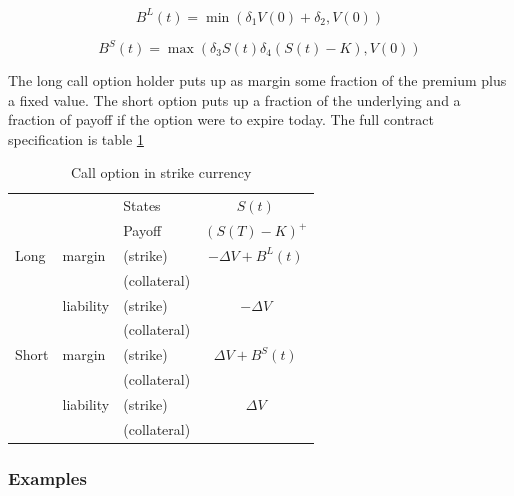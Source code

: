 \documentclass[12pt]{article}
\begin{document}
\[ B^L(t) = \min(\delta_1 V(0) + \delta_2, V(0)) \]

\[ B^S(t) = \max(\delta_3 S(t) \delta_4 (S(t)-K), V(0)) \]

The long call option holder puts up as margin some fraction of the premium plus a fixed value. The short option puts up a fraction of the underlying and a fraction of payoff if the option were to expire today.  The full contract specification is table \ref{tab:callstrike}

\begin{table}
\centering
\begin{tabular}{lll|c}
\hline
&  & States & $S(t)$\\
&  & Payoff &  $(S(T)-K)^+$\\
Long      & margin    & (strike)     & $-\Delta V + B^L(t)$  \\
          &           & (collateral) &\\
          & liability & (strike)     & $-\Delta V$\\
          &           & (collateral)&\\
Short     & margin    & (strike)     & $\Delta V + B^S(t)$ \\
          &           & (collateral) &\\
          & liability & (strike)     & $\Delta V$\\
          &           & (collateral) &\\          
\hline
\end{tabular}
\caption{Call option in strike currency}
\label{tab:callstrike}
\end{table}

\subsubsection*{Examples}
\end{document}
